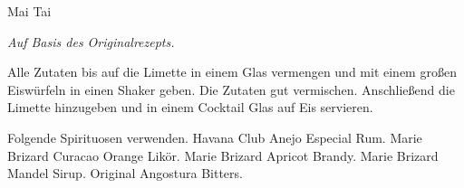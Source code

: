 \begin{recipe}{Mai Tai}{}{}

  \freeform{}\textit{Auf Basis des Originalrezepts.}


  Alle Zutaten bis auf die Limette in einem Glas vermengen und mit einem großen Eiswürfeln in einen Shaker geben.
  Die Zutaten gut vermischen.
  Anschließend die Limette hinzugeben und in einem Cocktail Glas auf Eis servieren.

  \freeform{}\hrulefill{}

  \freeform{}
  Folgende Spirituosen verwenden.
  Havana Club Anejo Especial Rum.
  Marie Brizard Curacao Orange Likör.
  Marie Brizard Apricot Brandy.
  Marie Brizard Mandel Sirup.
  Original Angostura Bitters.

\end{recipe}
